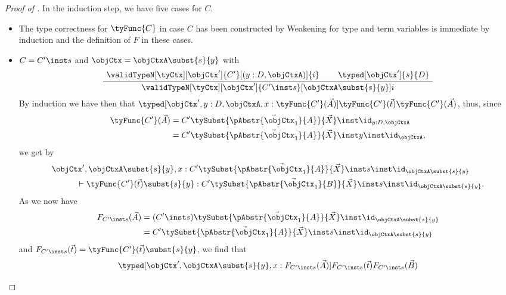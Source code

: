 \documentclass[preprint]{sigplanconf}
\begin{document}
\begin{proof}[Proof of ]
  In the induction step, we have five cases for $C$.
  \begin{itemize}
  \item The type correctness for $\tyFunc{C}$ in case $C$ has been constructed
    by Weakening for type and term variables is immediate by
    induction and the definition of $F$ in these cases.
  \item $C = C' \inst s$ and $\objCtx = \objCtxA \subst{s}{y}$ with
    \begin{equation*}
      \AxiomC{$\validTypeN[\tyCtx][\objCtx']
        {C'}[(y : D, \objCtxA)]{i}$}
      \AxiomC{$\typed[\objCtx']{s}{D}$}
      \BinaryInfC{$\validTypeN[\tyCtx][\objCtx']
        {C' \inst s}[\objCtxA \subst{s}{y}]{i}$}
      \DisplayProof
    \end{equation*}
    By induction we have then that
    $\typed[\objCtx', y : D, \objCtxA, x : \tyFunc{C'}(\vec{A})]
    {\tyFunc{C'}(\vec{t})}{\tyFunc{C'}(\vec{A})}$,
    thus, since
    \begin{align*}
      \tyFunc{C'}(\vec{A})
      & = C' \tySubst{\vec{\pAbstr{\objCtx_1}{A}}}{\vec{X}}
      \inst \id_{y : D, \objCtxA} \\
      & = C' \tySubst{\vec{\pAbstr{\objCtx_1}{A}}}{\vec{X}}
      \inst y \inst \id_{\objCtxA},
    \end{align*}
    we get by 
    \begin{align*}
      & \objCtx', \objCtxA \subst{s}{y},
      x : C' \tySubst{\vec{\pAbstr{\objCtx_1}{A}}}{\vec{X}}
      \inst s \inst \id_{\objCtxA \subst{s}{y}} \\
      & \qquad \quad \vdash
      {\tyFunc{C'}(\vec{t})\subst{s}{y}}
      :
      {C' \tySubst{\vec{\pAbstr{\objCtx_1}{B}}}{\vec{X}}
        \inst s \inst \id_{\objCtxA \subst{s}{y}}}.
    \end{align*}
    As we now have
    \begin{align*}
      F_{C' \inst s}(\vec{A})
      & = (C' \inst s) \tySubst{\vec{\pAbstr{\objCtx_1}{A}}}{\vec{X}}
      \inst \id_{\objCtxA  \subst{s}{y}} \\
      & = C' \tySubst{\vec{\pAbstr{\objCtx_1}{A}}}{\vec{X}}
      \inst s \inst \id_{\objCtxA  \subst{s}{y}}
    \end{align*}
    and $F_{C' \inst s}(\vec{t}) = \tyFunc{C'}(\vec{t})\subst{s}{y}$,
    we find that
    \begin{equation*}
      \typed[\objCtx', \objCtxA \subst{s}{y},
      x : F_{C' \inst s}(\vec{A})]
      {F_{C' \inst s}(\vec{t})}
      {F_{C' \inst s}(\vec{B})}

\end{equation*}
\end{itemize}
\end{proof}
\end{document}

